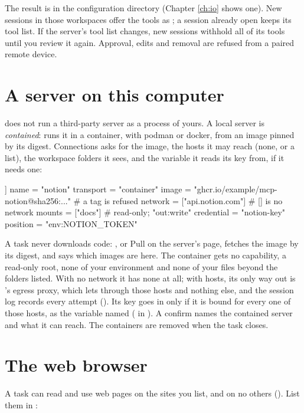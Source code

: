 The result is  in the configuration directory (Chapter
\ref{ch:io} shows one). New sessions in those workspaces offer the tools as
; a session already open keeps its tool list. If the
server's tool list changes, new sessions withhold all of its tools until you
review it again. Approval, edits and removal are refused from a paired
remote device.

\section{A server on this computer}

\nodwyn{} does not run a third-party server as a process of yours. A local
server is \emph{contained}: \nodwyn{} runs it in a container, with podman or
docker, from an image pinned by its digest. Connections asks for the image,
the hosts it may reach (none, or a list), the workspace folders it sees, and
the variable it reads its key from, if it needs one:

\begin{txt}
[[server]]
name = "notion"
transport = "container"
image = "ghcr.io/example/mcp-notion@sha256:..."   # a tag is refused
network = ["api.notion.com"]                      # [] is no network
mounts = ["docs"]                                 # read-only; "out:write"
credential = "notion-key"
position = "env:NOTION_TOKEN"
\end{txt}

A task never downloads code: , or Pull on the
server's page, fetches the image by its digest, and  says
which images are here. The container gets no capability, a read-only root,
none of your environment and none of your files beyond the folders listed.
With no network it has none at all; with hosts, its only way out is
\nodwyn{}'s egress proxy, which lets through those hosts and nothing else,
and the session log records every attempt (). Its key goes
in only if it is bound for every one of those hosts, as the variable named
( in ). A confirm names the
contained server and what it can reach. The containers are removed when the
task closes.

\section{The web browser}

A task can read and use web pages on the sites you list, and on no others
(). List them in :

